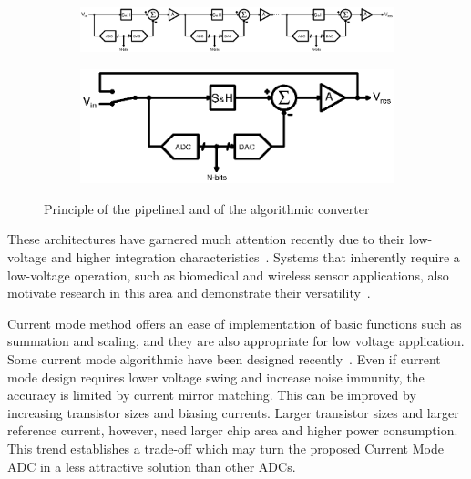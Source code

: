 \begin{figure}[htp]
	\centering
    \begin{subfigure}[b]{\textwidth}
        \includegraphics[width=\textwidth]{Chapter2/Figs/Vector/pipelined.ps}
        \vspace{2em}
        \label{fig:pipelined-principle}
	\end{subfigure}
	\begin{subfigure}[b]{0.4\textwidth}
        \includegraphics[width=\textwidth]{Chapter2/Figs/Vector/algorithmic.ps}
        \label{fig:algorithmic-principle}
    \end{subfigure}
	\caption{Principle of the pipelined and of the algorithmic converter}
	\label{fig:algo_desc}
\end{figure}

These architectures have garnered much attention recently due to their low-voltage and higher integration characteristics~\cite{Steyaert2012,Lee2011,SKLee2011,Brooks2009,Hershberg2012,YLim2015,YLim2015FD,Megawer2016,YCao2017}. Systems that inherently require a low-voltage operation, such as biomedical and wireless sensor applications, also motivate research in this area and demonstrate their versatility~\cite{Steyaert2012,Lee2011,SKLee2011}.


Current mode method offers an ease of implementation of basic functions such as summation and scaling, and they are also appropriate for low voltage application. Some current mode algorithmic have been designed recently~\cite{Nairn1990,Wang1991,Khodabndehloo2009,Bhatia2011}. Even if current mode design requires lower voltage swing and increase noise immunity, the accuracy is limited by current mirror matching. This can be improved by increasing transistor sizes and biasing currents. Larger transistor sizes and larger reference current, however, need larger chip area and higher power consumption. This trend establishes a trade-off which may turn the proposed Current Mode ADC in a less attractive solution than other ADCs\cite{Wang1991}. 

